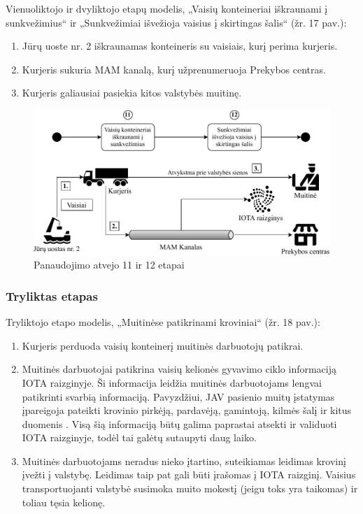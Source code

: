 Vienuoliktojo ir dvyliktojo etapų modelis, „Vaisių konteineriai iškraunami į sunkvežimius“ ir „Sunkvežimiai išvežioja vaisius į skirtingas šalis“ (žr. 17 pav.):
\begin{enumerate}
    \item Jūrų uoste nr. 2 iškraunamas konteineris su vaisiais, kurį perima kurjeris.
    \item Kurjeris sukuria MAM kanalą, kurį užprenumeruoja Prekybos centras.
    \item Kurjeris galiausiai pasiekia kitos valstybės muitinę.
\end{enumerate}

\begin{figure}[H]
    \centering
    \includegraphics[scale=0.75]{images/iota-usecase-11-12}
    \caption{Panaudojimo atvejo 11 ir 12 etapai}
\end{figure}




\subsubsection{Tryliktas etapas}

Tryliktojo etapo modelis, „Muitinėse patikrinami kroviniai“ (žr. 18 pav.):
\begin{enumerate}
    \item Kurjeris perduoda vaisių konteinerį muitinės darbuotojų patikrai.
    \item Muitinės darbuotojai patikrina vaisių kelionės gyvavimo ciklo informaciją IOTA raizginyje. Ši informacija leidžia muitinės darbuotojams lengvai patikrinti svarbią informaciją. Pavyzdžiui, JAV pasienio muitų įstatymas įpareigoja pateikti krovinio pirkėją, pardavėją, gamintoją, kilmės šalį ir kitus duomenis \cite{customs2018importer}. Visą šią informaciją būtų galima paprastai atsekti ir validuoti IOTA raizginyje, todėl tai galėtų sutaupyti daug laiko. 
    \item Muitinės darbuotojams neradus nieko įtartino, suteikiamas leidimas krovinį įvežti į valstybę. Leidimas taip pat gali būti įrašomas į IOTA raizginį. Vaisius transportuojanti valstybė susimoka muito mokestį (jeigu toks yra taikomas) ir toliau tęsia kelionę.
\end{enumerate}

